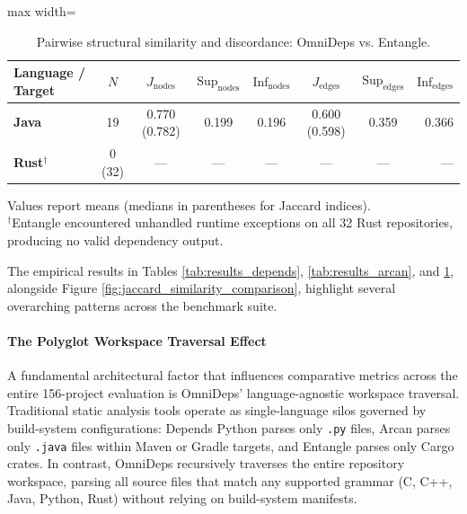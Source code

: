 \begin{table}[htpb]
  \centering
  \small
  \caption{Pairwise structural similarity and discordance: OmniDeps
  vs. Entangle.}
  \label{tab:results_entangle}
  \vspace{0.4em}
  \begin{adjustbox}{max width=\textwidth}
    \begin{tabular}{lccccccr}
      \toprule
      \textbf{Language / Target} & $N$ & $J_{\text{nodes}}$ &
      $\text{Sup}_{\text{nodes}}$ & $\text{Inf}_{\text{nodes}}$ &
      $J_{\text{edges}}$ & $\text{Sup}_{\text{edges}}$ &
      $\text{Inf}_{\text{edges}}$ \\
      \midrule
      \textbf{Java}           & 19     & 0.770 (0.782) & 0.199 &
      0.196 & 0.600 (0.598) & 0.359 & 0.366 \\
      \textbf{Rust}$^\dagger$ & 0 (32) & ---           & ---   & ---
      & ---           & ---   & ---   \\
      \bottomrule
    \end{tabular}
  \end{adjustbox}
  \vspace{0.2em}
  \footnotesize
  Values report means (medians in parentheses for Jaccard indices).\\
  $^\dagger$Entangle encountered unhandled runtime exceptions on all
  32 Rust repositories, producing no valid dependency output.
\end{table}

The empirical results in Tables \ref{tab:results_depends},
\ref{tab:results_arcan}, and
\ref{tab:results_entangle}, alongside Figure
\ref{fig:jaccard_similarity_comparison},
highlight several overarching patterns across the benchmark suite.

\paragraph{The Polyglot Workspace Traversal Effect}
A fundamental architectural factor that influences comparative
metrics across the
entire 156-project evaluation is OmniDeps' language-agnostic
workspace traversal.
Traditional static analysis tools operate as single-language silos governed by
build-system configurations: Depends Python parses only \texttt{.py}
files, Arcan parses
only \texttt{.java} files within Maven or Gradle targets, and
Entangle parses only Cargo crates.
In contrast, OmniDeps recursively traverses the entire repository
workspace, parsing
all source files that match any supported grammar (C, C++, Java,
Python, Rust) without
relying on build-system manifests.

